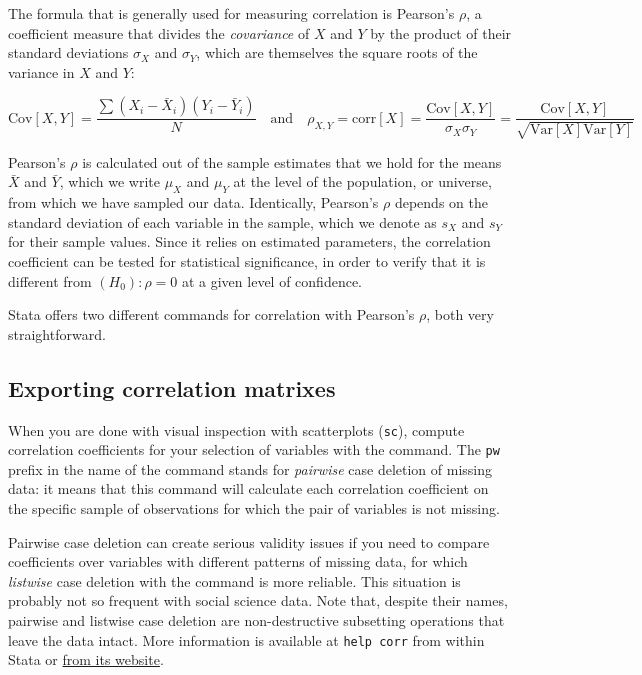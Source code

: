   The formula that is generally used for measuring correlation is Pearson's $\rho$, a coefficient measure that divides the \emph{covariance} of $X$ and $Y$ by the product of their standard deviations $\sigma_X$ and $\sigma_Y$, which are themselves the square roots of the variance in $X$ and $Y$:

  $$\text{Cov}[X,Y] = \frac{\sum{(X_i-\bar X_i)(Y_i-\bar Y_i)}}{N} \quad \text{and} \quad \rho_{X,Y} = \text{corr}[X] = \frac{\text{Cov}[X,Y]}{\sigma_X \sigma_Y} = \frac{\text{Cov}[X,Y]}{\sqrt{\text{Var}[X] \text{Var}[Y]}}$$

  Pearson's $\rho$ is calculated out of the sample estimates that we hold for the means $\bar X$ and $\bar Y$, which we write $\mu_X$ and $\mu_Y$ at the level of the population, or universe, from which we have sampled our data. Identically, Pearson's $\rho$ depends on the standard deviation of each variable in the sample, which we denote as $s_X$ and $s_Y$ for their sample values. Since it relies on estimated parameters, the correlation coefficient can be tested for statistical significance, in order to verify that it is different from $(H_0): \rho = 0$ at a given level of confidence.

  Stata offers two different commands for correlation with Pearson's $\rho$, both very straightforward. 

\subsection{Exporting correlation matrixes}%

When you are done with visual inspection with scatterplots (\texttt{sc}), compute correlation coefficients for your selection of variables with the  command. The \texttt{pw} prefix in the name of the command stands for \emph{pairwise} case deletion of missing data: it means that this command will calculate each correlation coefficient on the specific sample of observations for which the pair of variables is not missing.

\label{casewise}Pairwise case deletion can create serious validity issues if you need to compare coefficients over variables with different patterns of missing data, for which \emph{listwise} case deletion with the  command is more reliable. This situation is probably not so frequent with social science data. Note that, despite their names, pairwise and listwise case deletion are non-destructive subsetting operations that leave the data intact. More information is available at \texttt{help corr} from within Stata or \href{http://www.stata.com/help.cgi?correlate}{from its website}.


